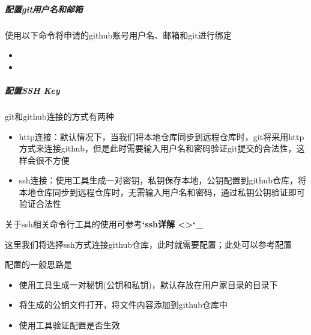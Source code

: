 \documentclass[a4paper,10pt,english]{sphinxmanual}
\begin{document}
\begin{figure}[htbp]
\centering

\noindent{}
\end{figure}


\subparagraph{配置git用户名和邮箱}
\label{\detokenize{sphinx/2-collocation/1-github/2-ConfigRemote:git}}
使用以下命令将申请的github账号用户名、邮箱和git进行绑定
\begin{itemize}
\item {} 

\item {} 

\end{itemize}

\begin{figure}[htbp]
\centering

\noindent{}
\end{figure}

\begin{figure}[htbp]
\centering

\noindent{}
\end{figure}


\subparagraph{配置SSH Key}
\label{\detokenize{sphinx/2-collocation/1-github/2-ConfigRemote:ssh-key}}
git和github连接的方式有两种
\begin{itemize}
\item {} 
http连接：默认情况下，当我们将本地仓库同步到远程仓库时，git将采用http方式来连接github，但是此时需要输入用户名和密码验证git提交的合法性，这样会很不方便

\item {} 
ssh连接：使用工具生成一对密钥，私钥保存本地，公钥配置到github仓库，将本地仓库同步到远程仓库时，无需输入用户名和密码，通过私钥公钥验证即可验证合法性

\end{itemize}

关于ssh相关命令行工具的使用可参考{\color{red}\bfseries{}{}`ssh详解 \textless{}\textgreater{}{}`\_}

这里我们将选择ssh方式连接github仓库，此时就需要配置；此处可以参考配置

配置的一般思路是
\begin{itemize}
\item {} 
使用工具生成一对秘钥(公钥和私钥)，默认存放在用户家目录的目录下

\item {} 
将生成的公钥文件打开，将文件内容添加到github仓库中

\item {} 
使用工具验证配置是否生效

\end{itemize}
\end{document}

